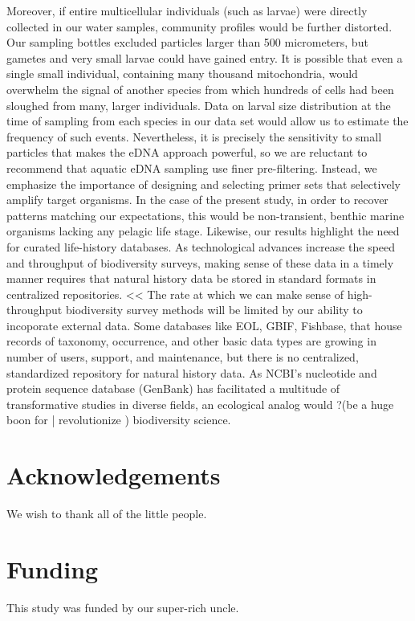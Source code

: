 \documentclass[11pt,letterpaper]{article} %
\begin{document}
{Moreover, if entire multicellular individuals (such as larvae) were directly collected in our water samples, community profiles would be further distorted.
Our sampling bottles excluded particles larger than 500 micrometers, but gametes and very small larvae could have gained entry.
It is possible that even a single small individual, containing many thousand mitochondria, would overwhelm the signal of another species from which hundreds of cells had been sloughed from many, larger individuals.
Data on larval size distribution at the time of sampling from each species in our data set would allow us to estimate the frequency of such events.
Nevertheless, it is precisely the sensitivity to small particles that makes the eDNA approach powerful, so we are reluctant to recommend that aquatic eDNA sampling use finer pre-filtering.
Instead, we emphasize the importance of designing and selecting primer sets that selectively amplify target organisms.
In the case of the present study, in order to recover patterns matching our expectations, this would be non-transient, benthic marine organisms lacking any pelagic life stage.
Likewise, our results highlight the need for curated life-history databases.
As technological advances increase the speed and throughput of biodiversity surveys, making sense of these data in a timely manner requires that natural history data be stored in standard formats in centralized repositories.
<< The rate at which we can make sense of high-throughput biodiversity survey methods will be limited by our ability to incoporate external data.
Some databases like EOL, GBIF, Fishbase, that house records of taxonomy, occurrence, and other basic data types are growing in number of users, support, and maintenance, but there is no centralized, standardized repository for natural history data.
As NCBI's nucleotide and protein sequence database (GenBank) has facilitated a multitude of transformative studies in diverse fields,
an ecological analog would ?(be a huge boon for | revolutionize ) biodiversity science.

\section*{Acknowledgements}
We wish to thank all of the little people.

\section*{Funding}
This study was funded by our super-rich uncle.

}
\end{document}
